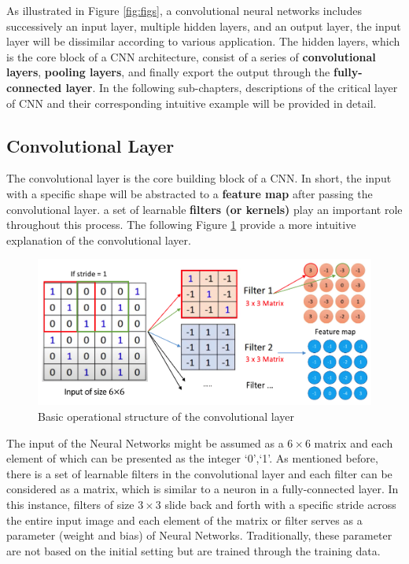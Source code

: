 \documentclass[]{krantz}
\begin{document}
As illustrated in Figure \ref{fig:figs}, a convolutional neural networks includes successively an input layer, multiple hidden layers, and an output layer, the input layer will be dissimilar according to various application. The hidden layers, which is the core block of a CNN architecture, consist of a series of \textbf{convolutional layers}, \textbf{pooling layers}, and finally export the output through the \textbf{fully-connected layer}. In the following sub-chapters, descriptions of the critical layer of CNN and their corresponding intuitive example will be provided in detail.
\citet{Scherer2010EvaluationOP}

\hypertarget{convolutional-layer}{%
\subsection{Convolutional Layer}\label{convolutional-layer}}

The convolutional layer is the core building block of a CNN. In short, the input with a specific shape will be abstracted to a \textbf{feature map} after passing the convolutional layer. a set of learnable \textbf{filters (or kernels)} play an important role throughout this process. The following Figure \ref{fig:figs-2} provide a more intuitive explanation of the convolutional layer.

\begin{figure}[ht]

{\centering \includegraphics[width=0.65\linewidth]{figures/01-03-cnns-and-their-applications-in-nlp/Matrix} 

}

\caption{Basic operational structure of the convolutional layer}\label{fig:figs-2}
\end{figure}

The input of the Neural Networks might be assumed as a \(6 \times 6\) matrix and each element of which can be presented as the integer `0',`1'. As mentioned before, there is a set of learnable filters in the convolutional layer and each filter can be considered as a matrix, which is similar to a neuron in a fully-connected layer. In this instance, filters of size \(3 \times 3\) slide back and forth with a specific stride across the entire input image and each element of the matrix or filter serves as a parameter (weight and bias) of Neural Networks. Traditionally, these parameter are not based on the initial setting but are trained through the training data.
\end{document}
